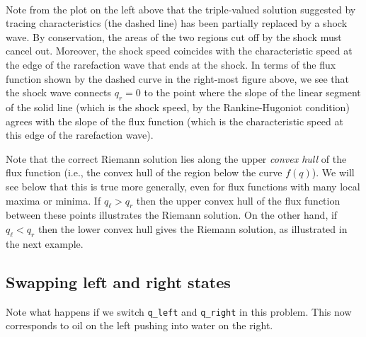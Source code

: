 \documentclass{SIAMbook2016}
\begin{document}
    \begin{center}
    \end{center}
    { \hspace*{\fill} \\}
    
Note from the plot on the left above that the triple-valued solution
suggested by tracing characteristics (the dashed line) has been
partially replaced by a shock wave. By conservation, the areas of the
two regions cut off by the shock must cancel out. Moreover, the shock
speed coincides with the characteristic speed at the edge of the
rarefaction wave that ends at the shock. In terms of the flux function
shown by the dashed curve in the right-most figure above, we see that
the shock wave connects \(q_r=0\) to the point where the slope of the
linear segment of the solid line (which is the shock speed, by the
Rankine-Hugoniot condition) agrees with the slope of the flux function
(which is the characteristic speed at this edge of the rarefaction
wave).

Note that the correct Riemann solution lies along the upper \emph{convex
hull} of the flux function (i.e., the convex hull of the region below
the curve \(f(q)\)). We will see below that this is true more generally,
even for flux functions with many local maxima or minima. If
\(q_\ell > q_r\) then the upper convex hull of the flux function between
these points illustrates the Riemann solution. On the other hand, if
\(q_\ell < q_r\) then the lower convex hull gives the Riemann solution,
as illustrated in the next example.

\hypertarget{swapping-left-and-right-states}{%
\subsection{Swapping left and right
states}\label{swapping-left-and-right-states}}

Note what happens if we switch \texttt{q\_left} and \texttt{q\_right} in
this problem. This now corresponds to oil on the left pushing into water
on the right.

\newpage
\end{document}
